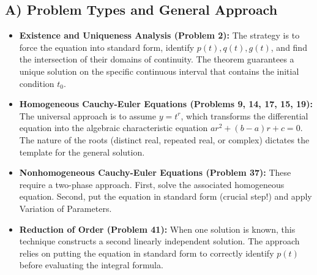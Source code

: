\documentclass{article}
\begin{document}
\subsection{A) Problem Types and General Approach}
\begin{itemize}
    \item \textbf{Existence and Uniqueness Analysis (Problem 2):} The strategy is to force the equation into standard form, identify $p(t), q(t), g(t)$, and find the intersection of their domains of continuity. The theorem guarantees a unique solution on the specific continuous interval that contains the initial condition $t_0$.
    \item \textbf{Homogeneous Cauchy-Euler Equations (Problems 9, 14, 17, 15, 19):} The universal approach is to assume $y = t^r$, which transforms the differential equation into the algebraic characteristic equation $ar^2 + (b-a)r + c = 0$. The nature of the roots (distinct real, repeated real, or complex) dictates the template for the general solution.
    \item \textbf{Nonhomogeneous Cauchy-Euler Equations (Problem 37):} These require a two-phase approach. First, solve the associated homogeneous equation. Second, put the equation in standard form (crucial step!) and apply Variation of Parameters.
    \item \textbf{Reduction of Order (Problem 41):} When one solution is known, this technique constructs a second linearly independent solution. The approach relies on putting the equation in standard form to correctly identify $p(t)$ before evaluating the integral formula.
\end{itemize}
\end{document}
